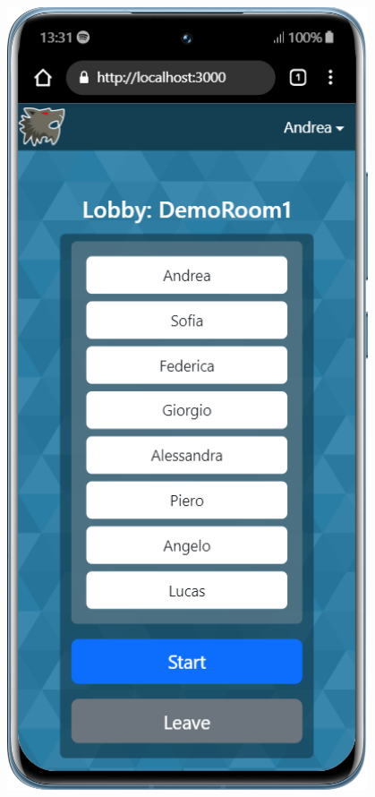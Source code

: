 \begin{figure}[H]
    \centering
    \begin{minipage}{0.25\textwidth}
        \centering
        \includegraphics[width=0.95\textwidth]{img/screen/mobile/lobby_mobile.png}

\end{minipage}
\end{figure}

